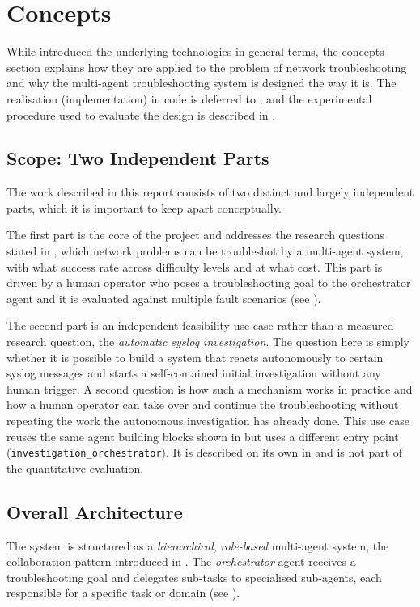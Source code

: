 \section{Concepts}
\label{sec:concepts}
While  introduced the underlying technologies in general terms, the
concepts section explains how they are applied to the problem of network troubleshooting and why the
multi-agent troubleshooting system is designed the way it is. The realisation (implementation) in code is deferred to
, and the experimental procedure used to evaluate the design is described in
.


\subsection{Scope: Two Independent Parts}
\label{sec:concepts-scope}
The work described in this report consists of two distinct and largely independent parts, which it is
important to keep apart conceptually.

The first part is the core of the project and addresses the research questions stated in
, which network problems can be troubleshot by a multi-agent system, with what
success rate across difficulty levels and at what cost. This part is driven by a human operator who poses a
troubleshooting goal to the orchestrator agent and it is evaluated against multiple fault scenarios (see ).

The second part is an independent feasibility use case rather than a measured research question, the
\emph{automatic syslog investigation}. The question here is simply whether it is possible to build a system that reacts
autonomously to certain syslog messages and starts a self-contained initial investigation without any
human trigger. A second question is how such
a mechanism works in practice and how a human operator can take over and continue the troubleshooting without
repeating the work the autonomous investigation has already done. This use case reuses the same
agent building blocks shown in  but uses a different entry point (\texttt{investigation\_orchestrator}). It is described on its own in
 and is not part of the quantitative evaluation.

\subsection{Overall Architecture}
\label{sec:architecture}
The system is structured as a \emph{hierarchical}, \emph{role-based} multi-agent system, the collaboration
pattern introduced in . The \emph{orchestrator} agent receives a troubleshooting
goal and delegates sub-tasks to specialised sub-agents, each responsible for a specific task or domain (see ).

